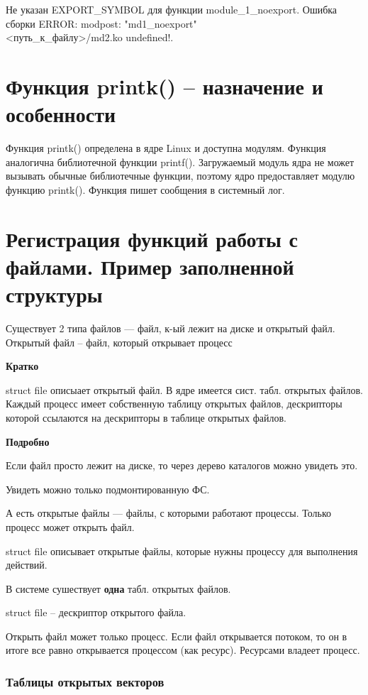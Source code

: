 Не указан EXPORT\_SYMBOL для функции module\_1\_noexport. Ошибка сборки ERROR: modpost: "md1\_noexport" \\ <путь\_к\_файлу>/md2.ko undefined!.

\section{Функция printk() – назначение и особенности}
Функция printk() определена в ядре Linux и доступна модулям. Функция аналогична библиотечной функции printf(). Загружаемый модуль ядра не может вызывать обычные библиотечные функции, поэтому ядро предоставляет модулю функцию printk(). Функция пишет сообщения в системный лог.

\section{Регистрация функций работы с файлами. Пример заполненной структуры}

Существует 2 типа файлов --- файл, к-ый лежит на диске и открытый файл. Открытый файл -- файл, который открывает процесс

\textbf{Кратко}

struct file описыает открытый файл. В ядре имеется сист. табл. открытых файлов. Каждый процесс имеет собственную таблицу открытых файлов, дескрипторы которой ссылаются на дескрипторы в таблице открытых файлов.

\textbf{Подробно}

Если файл просто лежит на диске, то через дерево каталогов можно увидеть это. 

Увидеть можно только подмонтированную ФС.

А есть открытые файлы --- файлы, с которыми работают процессы. Только процесс может открыть файл.

struct file описывает открытые файлы, которые нужны процессу для выполнения действий.

В системе сушествует \textbf{одна} табл. открытых файлов.

struct file -- дескриптор открытого файла.

Открыть файл может только процесс. Если файл открывается потоком, то он в итоге все равно открывается процессом (как ресурс). Ресурсами владеет процесс.


\subsubsection{Таблицы открытых векторов}

